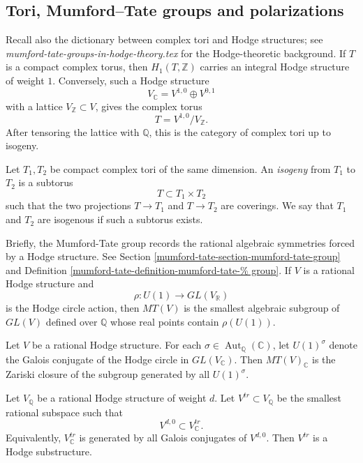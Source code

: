 \subsection{Tori, Mumford--Tate groups and
polarizations}
\label{subsection-tori-mumford-tate-polarizations}

\medskip
Recall also the dictionary between complex
tori and Hodge structures; see
{\it mumford-tate-groups-in-hodge-theory.tex}
for the Hodge-theoretic background.
If $T$ is a compact complex torus, then
$H_1(T,\mathbb{Z})$ carries an integral
Hodge structure of weight $1$.
Conversely, such a Hodge structure
$$
V_{\mathbb{C}}=V^{1,0}\oplus V^{0,1}
$$
with a lattice $V_{\mathbb{Z}}\subset V$,
gives the complex torus
$$
T=V^{1,0}/V_{\mathbb{Z}}.
$$
After tensoring the lattice with
$\mathbb{Q}$, this is the category of
complex tori up to isogeny.

\begin{definition}
\label{definition-isogeny-tori}
Let $T_1,T_2$ be compact complex tori of the
same dimension.
An {\it isogeny} from $T_1$ to $T_2$ is a
subtorus
$$
T\subset T_1\times T_2
$$
such that the two projections
$T\to T_1$ and $T\to T_2$ are coverings.
We say that $T_1$ and $T_2$ are isogenous
if such a subtorus exists.
\end{definition}

\medskip
Briefly, the Mumford-Tate group records the
rational algebraic symmetries forced by a
Hodge structure.
See Section
\ref{mumford-tate-section-mumford-tate-group}
and Definition
\ref{mumford-tate-definition-mumford-tate-%
group}.
If $V$ is a rational Hodge structure and
$$
\rho:U(1)\longrightarrow
GL(V_{\mathbb{R}})
$$
is the Hodge circle action, then $MT(V)$ is
the smallest algebraic subgroup of $GL(V)$
defined over $\mathbb{Q}$ whose real points
contain $\rho(U(1))$.

\begin{proposition}
\label{proposition-mt-generated-galois}
Let $V$ be a rational Hodge structure.
For each
$\sigma\in\operatorname{Aut}_{\mathbb{Q}}
(\mathbb{C})$,
let $U(1)^\sigma$ denote the Galois conjugate
of the Hodge circle in
$GL(V_{\mathbb{C}})$.
Then $MT(V)_{\mathbb{C}}$ is the Zariski
closure of the subgroup generated by all
$U(1)^\sigma$.
\end{proposition}

\begin{theorem}
\label{theorem-transcendental-hodge-lattice}
Let $V_{\mathbb{Q}}$ be a rational Hodge
structure of weight $d$.
Let $V^{tr}\subset V_{\mathbb{Q}}$ be the
smallest rational subspace such that
$$
V^{d,0}\subset V^{tr}_{\mathbb{C}}.
$$
Equivalently, $V^{tr}_{\mathbb{C}}$ is
generated by all Galois conjugates of
$V^{d,0}$.
Then $V^{tr}$ is a Hodge substructure.
\end{theorem}

